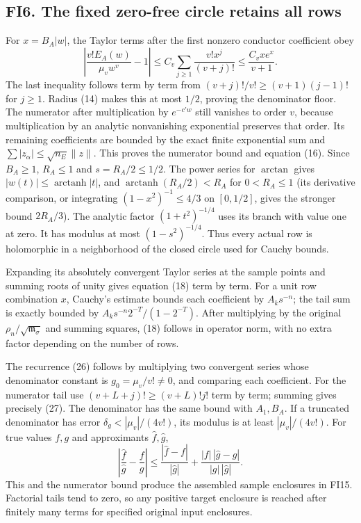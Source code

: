 \documentclass[11pt]{article}
\begin{document}
\subsection{FI6. The fixed zero-free circle retains all rows}\label{fi6.-the-fixed-zero-free-circle-retains-all-rows}

For \(x=B_A|w|\), the Taylor terms after the first nonzero conductor coefficient obey \[
 \left|\frac{v!E_A(w)}{\mu_vw^v}-1\right|
 \le C_v\sum_{j\ge1}\frac{v!x^j}{(v+j)!}
 \le \frac{C_vxe^x}{v+1}.
\] The last inequality follows term by term from \((v+j)!/v!\ge(v+1)(j-1)!\) for \(j\ge1\). Radius (14) makes this at most \(1/2\), proving the denominator floor. The numerator after multiplication by \(e^{-c'w}\) still vanishes to order \(v\), because multiplication by an analytic nonvanishing exponential preserves that order. Its remaining coefficients are bounded by the exact finite exponential sum and \(\sum|z_\alpha|\le\sqrt{n_E}\|z\|\). This proves the numerator bound and equation (16). Since \(B_A\ge1\), \(R_A\le1\) and \(s=R_A/2\le1/2\). The power series for \(\arctan\) gives \(|w(t)|\le\operatorname{arctanh}|t|\), and \(\operatorname{arctanh}(R_A/2)<R_A\) for \(0<R_A\le1\) (its derivative comparison, or integrating \((1-x^2)^{-1}\le4/3\) on \([0,1/2]\), gives the stronger bound \(2R_A/3\)). The analytic factor \((1+t^2)^{-1/4}\) uses its branch with value one at zero. It has modulus at most \((1-s^2)^{-1/4}\). Thus every actual row is holomorphic in a neighborhood of the closed circle used for Cauchy bounds.

Expanding its absolutely convergent Taylor series at the sample points and summing roots of unity gives equation (18) term by term. For a unit row combination \(x\), Cauchy's estimate bounds each coefficient by \(A_ks^{-n}\); the tail sum is exactly bounded by \(A_ks^{-n}2^{-T}/(1-2^{-T})\). After multiplying by the original \(\rho_n/\sqrt{\mathfrak m_\sigma}\) and summing squares, (18) follows in operator norm, with no extra factor depending on the number of rows.

The recurrence (26) follows by multiplying two convergent series whose denominator constant is \(g_0=\mu_v/v!\ne0\), and comparing each coefficient. For the numerator tail use \((v+L+j)!\ge(v+L)!j!\) term by term; summing gives precisely (27). The denominator has the same bound with \(A_1,B_A\). If a truncated denominator has error \(\delta_g<|\mu_v|/(4v!)\), its modulus is at least \(|\mu_v|/(4v!)\). For true values \(f,g\) and approximants \(\widehat f,\widehat g\), \[
 \left|\frac{\widehat f}{\widehat g}-\frac f g\right|
 \le\frac{|\widehat f-f|}{|\widehat g|}
 +\frac{|f|\,|\widehat g-g|}{|g|\,|\widehat g|}.
 \tag{FI16}
\] This and the numerator bound produce the assembled sample enclosures in FI15. Factorial tails tend to zero, so any positive target enclosure is reached after finitely many terms for specified original input enclosures.
\end{document}
